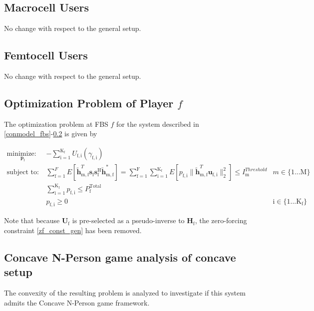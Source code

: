 \documentclass[12pt,a4paper]{report}
\begin{document}
\subsection{Macrocell Users}
No change with respect to the general setup.

\subsection{Femtocell Users}\label{conmodel_fuser}
No change with respect to the general setup.



\subsection{Optimization Problem of Player $f$}\label{conproblem}
The optimization problem at FBS $f$ for the system described in \ref{conmodel_fbs}-\ref{conmodel_fuser} is given by

	\begin{subequations}
	\label{optim}
	\begin{align}
	    \underset{\mathbf{p}_{\mathrm{f}} }{\text{minimize: }} \;
	    & - \sum_{\mathrm{i=1}}^{\mathrm{K_f}}
    	U_{\mathrm{f,i}}(\gamma_{\mathrm{f,i}}) \label{player_opt_c} \\
	    \text{subject to: } \; &
	  \sum^F_{\text{f}=1} E\left[ \mathbf{\tilde{h}}_{\mathrm{m,f}}^T  \mathbf{s}_{\mathrm{f}} 						
	\mathbf{s_{\mathrm{f}}^{\mathrm{H}}} \mathbf{\tilde{h}_{\mathrm{m,f}}^*} \right]
	=
	\sum_{\mathrm{f=1}}^{\mathrm{F}}	\sum_{\mathrm{i=1}}^{\mathrm{K_f}}
	E\left[ p_{\mathrm{f,i}}\|\tilde{\mathbf{h}}_{\mathrm{m,f}}^T \mathbf{u}_{\mathrm{f,i}}\|^2_2\right]
	\leq I^{Threshold}		
	_{\mathrm{m}} & m \in \{1 ...\text{M}\} 
		\label{interference_const_c}\\
        & 
        	\sum_{\mathrm{i=1}}^{\mathrm{K_{\mathrm{f}}}} p_{\mathrm{f,i}}
	   \leq P_{\mathrm{f}}^{\text{Total}}  \label{power_const_c}\\
        & p_{\mathrm{f,i}} \geq 0 &  \text{i} \in \{1 ...\text{K}_{\mathrm{f}}\} \label{pos_power_const_c}
	\end{align}
	\end{subequations}

Note that because $\mathbf{U}_{\mathrm{f}}$ is pre-selected as a pseudo-inverse to  $\mathbf{H_\mathrm{f}}$, the zero-forcing constraint \eqref{zf_const_gen} has been removed.

\subsection{Concave N-Person game analysis of concave setup}
The convexity of the resulting problem is analyzed to investigate if this system admits the Concave N-Person game framework. 
\end{document}
